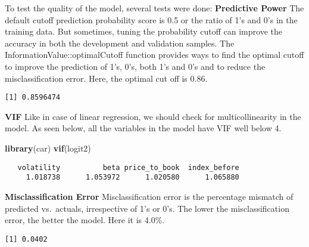 \documentclass[12pt,twoside]{reedthesis}
\newenvironment{Shaded}{\begin{snugshade}}{\end{snugshade}}
\newcommand{\KeywordTok}[1]{\textcolor[rgb]{0.13,0.29,0.53}{\textbf{{#1}}}}
\newcommand{\DecValTok}[1]{\textcolor[rgb]{0.00,0.00,0.81}{{#1}}}
\newcommand{\StringTok}[1]{\textcolor[rgb]{0.31,0.60,0.02}{{#1}}}
\newcommand{\NormalTok}[1]{{#1}}
\theoremstyle{definition}
\theoremstyle{definition}
\theoremstyle{definition}
\theoremstyle{remark}
\begin{document}
To test the quality of the model, several tests were done: \hfill\break
\textbf{Predictive Power} \hfill\break
The default cutoff prediction probability score is 0.5 or the ratio of
1's and 0's in the training data. But sometimes, tuning the probability
cutoff can improve the accuracy in both the development and validation
samples. The InformationValue::optimalCutoff function provides ways to
find the optimal cutoff to improve the prediction of 1's, 0's, both 1's
and 0's and to reduce the misclassification error. Here, the optimal cut
off is 0.86.
\begin{Shaded}
\end{Shaded}
\begin{verbatim}
[1] 0.8596474
\end{verbatim}
\hfill\break
\textbf{VIF} \hfill\break
Like in case of linear regression, we should check for multicollinearity
in the model. As seen below, all the variables in the model have VIF
well below 4.
\begin{Shaded}
\begin{Highlighting}[]
\KeywordTok{library}\NormalTok{(car)}
\KeywordTok{vif}\NormalTok{(logit2)}
\end{Highlighting}
\end{Shaded}
\begin{verbatim}
   volatility          beta price_to_book  index_before 
     1.018738      1.053972      1.020580      1.065880 
\end{verbatim}
\hfill\break
\textbf{Misclassification Error} \hfill\break
Misclassification error is the percentage mismatch of predicted
vs.~actuals, irrespective of 1's or 0's. The lower the misclassification
error, the better the model. Here it is 4.0\%.
\begin{Shaded}
\end{Shaded}
\begin{verbatim}
[1] 0.0402
\end{verbatim}
\end{document}
